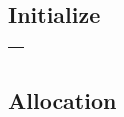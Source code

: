 \subsection{Initialize}

\begin{center}
  \begin{tabular}{|p{}|}
    \hline
    \begin{algorithmic}[1]
      \Ensure{$H$}
      \For{$i \in [N_c]$}
        \State{$V_i \assign (\mathrm{sizeOfClass(i)}, \epsilon)$}
      \EndFor
      \State{$H \assign (\{V_i\}_{i \in [N_c]}, \epsilon)$}
    \end{algorithmic}
    \\\hline
  \end{tabular}
\end{center}

\subsection{Allocation}

